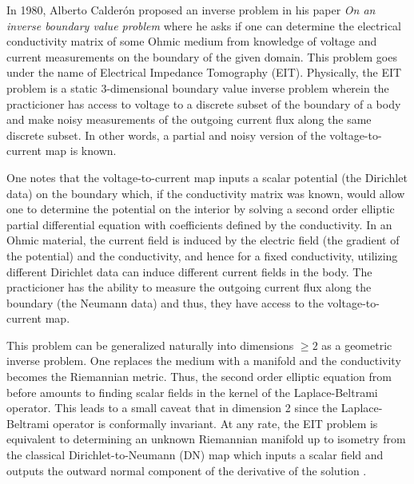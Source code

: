 In 1980, Alberto Calder\'on proposed an inverse problem in his paper \emph{On an inverse boundary value problem} \cite{calderon_inverse_2006} where he asks if one can determine the electrical conductivity matrix of some Ohmic medium from knowledge of voltage and current measurements on the boundary of the given domain. This problem goes under the name of Electrical Impedance Tomography (EIT). Physically, the EIT problem is a static 3-dimensional boundary value inverse problem wherein the practicioner has access to voltage to a discrete subset of the boundary of a body and make noisy measurements of the outgoing current flux along the same discrete subset. In other words, a partial and noisy version of the voltage-to-current map is known.

One notes that the voltage-to-current map inputs a scalar potential (the Dirichlet data) on the boundary which, if the conductivity matrix was known, would allow one to determine the potential on the interior by solving a second order elliptic partial differential equation with coefficients defined by the conductivity. In an Ohmic material, the current field is induced by the electric field (the gradient of the potential) and the conductivity, and hence for a fixed conductivity, utilizing different Dirichlet data can induce different current fields in the body. The practicioner has the ability to measure the outgoing current flux along the boundary (the Neumann data) and thus, they have access to the voltage-to-current map.   

This problem can be generalized naturally into dimensions $\geq 2$ as a geometric inverse problem. One replaces the medium with a manifold and the conductivity becomes the Riemannian metric. Thus, the second order elliptic equation from before amounts to finding scalar fields in the kernel of the Laplace-Beltrami operator. This leads to a small caveat that in dimension 2 since the Laplace-Beltrami operator is conformally invariant. At any rate, the EIT problem is equivalent to determining an unknown Riemannian manifold up to isometry from the classical Dirichlet-to-Neumann (DN) map which inputs a scalar field and outputs the outward normal component of the derivative of the solution \cite{feldman_calderproblem_nodate, salo_calderon_nodate, uhlmann_inverse_2014}. 

